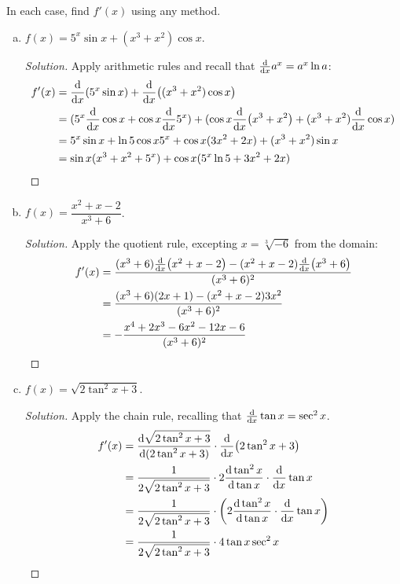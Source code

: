 \documentclass{agony}
\begin{document}
\question In each case, find $f'(x)$ using any method.
\begin{enumerate}[(a)]
  \item $f(x)=5^x\sin x+(x^3+x^2)\cos x$.
        \begin{proof}[Solution]
          Apply arithmetic rules and recall that $\dv{x}a^x=a^x\ln a$:
          \begin{align*}
            f'(x) & = \dv{x}(5^x\sin x)+\dv{x}((x^3+x^2)\cos x)                                         \\
                  & = (5^x\dv{x}\cos x + \cos x\dv{x}5^x)+(\cos x\dv{x}(x^3+x^2)+(x^3+x^2)\dv{x}\cos x) \\
                  & = 5^x\sin x + \ln 5\cos x5^x + \cos x(3x^2+2x)+(x^3+x^2)\sin x                      \\
                  & = \sin x(x^3+x^2+5^x) + \cos x(5^x\ln 5 + 3x^2+2x) \qedhere
          \end{align*}
        \end{proof}
  \item $f(x)=\dfrac{x^2+x-2}{x^3+6}$.
        \begin{proof}[Solution]
          Apply the quotient rule, excepting $x=\sqrt[3]{-6}$ from the domain:
          \begin{align*}
            f'(x) & = \frac{(x^3+6)\dv{x}(x^2+x-2)-(x^2+x-2)\dv{x}(x^3+6)}{(x^3+6)^2} \\
                  & = \frac{(x^3+6)(2x+1)-(x^2+x-2)3x^2}{(x^3+6)^2}                   \\
                  & = -\frac{x^4+2x^3-6x^2-12x-6}{(x^3+6)^2} \qedhere
          \end{align*}
        \end{proof}
  \item $f(x)=\sqrt{2\tan^2x+3}$.
        \begin{proof}[Solution]
          Apply the chain rule, recalling that $\dv{x}\tan x=\sec^2 x$.
          \begin{align*}
            f'(x)
             & = \dv{\sqrt{2\tan^2x+3}}{(2\tan^2x+3)}\cdot \dv{x}(2\tan^2x+3)                              \\
             & = \frac{1}{2\sqrt{2\tan^2x+3}} \cdot 2\dv{\tan^2x}{\tan x} \cdot \dv{x}\tan x               \\
             & = \frac{1}{2\sqrt{2\tan^2x+3}} \cdot \left(2\dv{\tan^2x}{\tan x} \cdot \dv{x}\tan x \right) \\
             & = \frac{1}{2\sqrt{2\tan^2x+3}} \cdot 4\tan x \sec^2x                                        \\

\end{align*}
\end{proof}
\end{enumerate}
\end{document}
